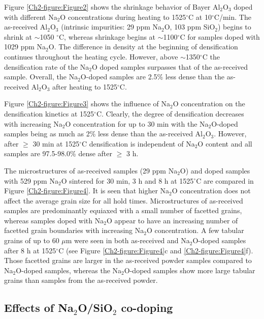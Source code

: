Figure \ref{Ch2-figure:Figure2} shows the shrinkage behavior of Bayer Al$_{2}$O$_{3}$ doped with different Na$_{2}$O concentrations during heating to 1525$^{\circ}$C at 10$^{\circ}$C/min. The as-received Al$_{2}$O$_{3}$ (intrinsic impurities: 29 ppm Na$_{2}$O, 103 ppm SiO$_{2}$) begins to shrink at $\sim$1050 $^{\circ}$C, whereas shrinkage begins at $\sim$1100$^{\circ}$C for samples doped with 1029 ppm Na$_{2}$O. The difference in density at the beginning of densification continues throughout the heating cycle. However, above $\sim$1350$^{\circ}$C the densification rate of the Na$_{2}$O doped samples surpasses that of the as-received sample. Overall, the Na$_{2}$O-doped samples are 2.5\% less dense than the as-received Al$_{2}$O$_{3}$ after heating to 1525$^{\circ}$C.

Figure \ref{Ch2-figure:Figure3} shows the influence of Na$_{2}$O concentration on the densification kinetics at 1525$^{\circ}$C. Clearly, the degree of densification decreases with increasing Na$_{2}$O concentration for up to 30 min with the Na$_{2}$O-doped samples being as much as 2\% less dense than the as-received Al$_{2}$O$_{3}$. However, after $\geq$ 30 min at 1525$^{\circ}$C densification is independent of Na$_{2}$O content and all samples are 97.5-98.0\% dense after $\geq$ 3 h. 

The microstructures of as-received samples (29 ppm Na$_{2}$O) and doped samples with 529 ppm Na$_{2}$O sintered for 30 min, 3 h and 8 h at 1525$^{\circ}$C are compared in Figure \ref{Ch2-figure:Figure4}. It is seen that higher Na$_{2}$O concentration does not affect the average grain size for all hold times. Microstructures of as-received samples are predominantly equiaxed with a small number of facetted grains, whereas samples doped with Na$_{2}$O appear to have an increasing number of facetted grain boundaries with increasing Na$_{2}$O concentration. A few tabular grains of up to 60 $\mu$m were seen in both as-received and Na$_{2}$O-doped samples after 8 h at 1525$^{\circ}$C (see Figure \ref{Ch2-figure:Figure4}c and \ref{Ch2-figure:Figure4}f). Those facetted grains are larger in the as-received powder samples compared to Na$_{2}$O-doped samples, whereas the Na$_{2}$O-doped samples show more large tabular grains than samples from the as-received powder.

\subsection{Effects of Na$_{2}$O/SiO$_{2}$ co-doping}

